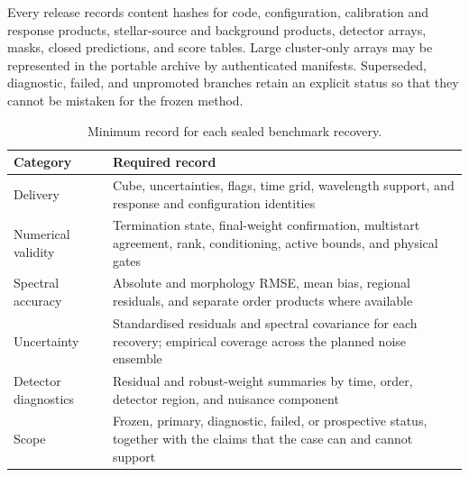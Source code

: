 Every release records content hashes for code, configuration, calibration and
response products, stellar-source and background products, detector arrays,
masks, closed predictions, and score tables. Large cluster-only arrays may be
represented in the portable archive by authenticated manifests. Superseded,
diagnostic, failed, and unpromoted branches retain an explicit status so that
they cannot be mistaken for the frozen method.

\begin{table}[t]
 \centering
 \footnotesize
 \caption{Minimum record for each sealed benchmark recovery.}
 \label{tab:benchmark-report}
 \setlength{\tabcolsep}{3pt}
 \begin{tabularx}{0.97\columnwidth}{@{}>{\raggedright\arraybackslash}p{}>{\raggedright\arraybackslash}X@{}}
  \toprule
  Category & Required record \\
  \midrule
  Delivery & Cube, uncertainties, flags, time grid, wavelength support, and
  response and configuration identities \\
  Numerical validity & Termination state, final-weight confirmation,
  multistart agreement, rank, conditioning, active bounds, and physical gates \\
  Spectral accuracy & Absolute and morphology RMSE, mean bias, regional
  residuals, and separate order products where available \\
  Uncertainty & Standardised residuals and spectral covariance for each
  recovery; empirical coverage across the planned noise ensemble \\
  Detector diagnostics & Residual and robust-weight summaries by time, order,
  detector region, and nuisance component \\
  Scope & Frozen, primary, diagnostic, failed, or prospective status, together
  with the claims that the case can and cannot support \\
  \bottomrule
 \end{tabularx}
\end{table}
